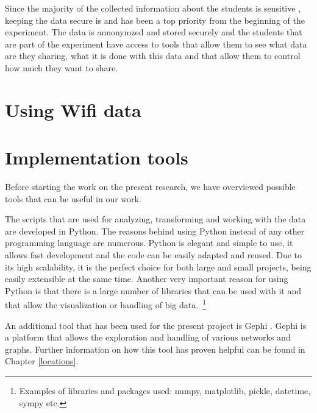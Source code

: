 Since the majority of the collected information about the students is sensitive
\cite{Stopczynski14p}, keeping the data secure is and has been a top priority
from the beginning of the experiment. The data is annonymzed and stored securely
and the students that are part of the experiment have access to tools that allow
them to see what data are they sharing, what it is done with this data and that
allow them to control how much they want to share.

\section{Using Wifi data}

\section{Implementation tools}
Before starting the work on the present research, we have overviewed possible
tools that can be useful in our work.

The scripts that are used for analyzing, transforming and working with the data
are developed in Python. The reasons behind using Python instead of any other
programming language are numerous. Python is elegant and simple to use, it
allows fast development and the code can be easily adapted and reused. Due to
its high scalability, it is the perfect choice for both large and small
projects, being easily extensible at the same time. Another very important
reason for using Python is that there is a large number of libraries that can be
used with it and that allow the visualization or handling of big
data.~\footnote{Examples of libraries and packages used: numpy, matplotlib,
pickle, datetime, sympy etc.}

An additional tool that has been used for the present project is Gephi
\cite{Gephi}. Gephi is a platform that allows the exploration and handling of
various networks and graphs. Further information on how this tool has proven
helpful can be found in Chapter \ref{locations}.

